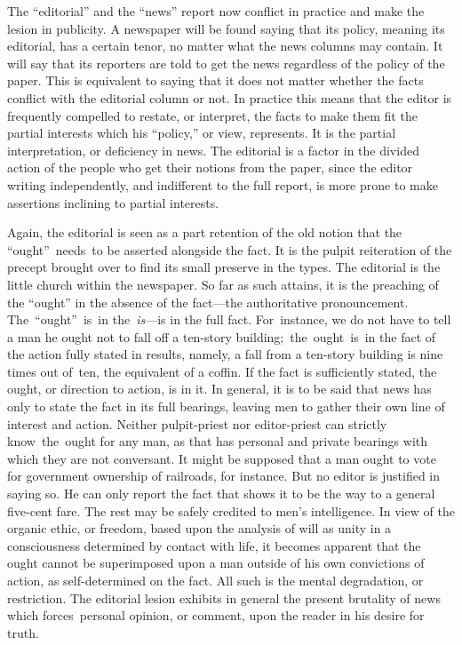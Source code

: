 \documentclass[openany,nobib]{tufte-book}
\begin{document}
The ``editorial'' and the ``news'' report now conflict in practice and
make the lesion in publicity. A newspaper will be found saying that its
policy, meaning its editorial, has a certain tenor, no matter what the
news columns may contain. It will say that its reporters are told to get
the news regardless of the policy of the paper. This is equivalent to
saying that it does not matter whether the facts conflict with the
editorial column or not. In practice this means that the editor is
frequently compelled to restate, or interpret, the facts to make them
fit the partial interests which his ``policy,'' or view, represents. It
is the partial interpretation, or deficiency in news. The editorial is a
factor in the divided action of the people who get their notions from
the paper, since the editor writing independently, and indifferent to
the full report, is more prone to make assertions inclining to partial
interests.~

Again, the editorial is seen as a part retention of the old notion that
the ``ought''~needs~to be asserted alongside the fact. It is the pulpit
reiteration of the precept brought over to find its small preserve in
the types. The editorial is the little church within the newspaper. So
far as such attains, it is the preaching of the ``ought'' in the absence
of the fact---the authoritative pronouncement. The~``ought''~is~in
the~\emph{is}---is in the full fact. For~instance, we do not have to
tell a man he ought not to fall off a ten-story
building;~the~ought~is~in the fact of the action fully stated in
results, namely, a fall from a ten-story building is nine times out
of~ten, the equivalent of a coffin. If the fact is sufficiently stated,
the ought, or direction to action, is in it. In general, it is to be
said that news has only to state the fact in its full bearings, leaving
men to gather their own line of interest and action. Neither
pulpit-priest nor editor-priest can strictly know~the~ought for any man,
as that has personal and private bearings with which they are not
conversant. It might be supposed that a man ought to vote for government
ownership of railroads, for instance. But no editor is justified in
saying so. He can only report the fact that shows it to be the way to a
general five-cent fare. The rest may be safely credited to men's
intelligence. In view of the organic ethic, or freedom, based upon the
analysis of will as unity in a consciousness determined by contact with
life, it becomes apparent that the ought cannot be superimposed upon a
man outside of his own convictions of action, as self-determined on the
fact. All such is the mental degradation, or restriction. The editorial
lesion exhibits in general the present brutality of news which
forces~personal opinion, or comment, upon the reader in his desire for
truth. ~
\end{document}
